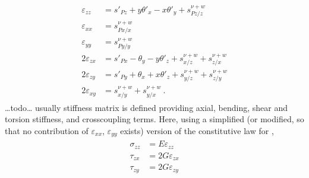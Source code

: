 \documentclass[letterpaper,10pt,english]{jupyterBook}
\begin{document}
\sphinxAtStartPar
{}
\begin{equation*}
\begin{split}\begin{aligned}
   \varepsilon_{zz} & = s'_{Pz} + y \theta'_x - x \theta'_y + s^{\nu+w}_{Pz/z} \\ 
   \varepsilon_{xx} & = s^{\nu+w}_{Px/x} \\
   \varepsilon_{yy} & = s^{\nu+w}_{Py/y} \\
 2 \varepsilon_{zx} & = s'_{Px} - \theta_y - y \theta'_z + s^{\nu+w}_{x/z} + s^{\nu+w}_{z/x} \\
 2 \varepsilon_{zy} & = s'_{Py} + \theta_x + x \theta'_z + s^{\nu+w}_{y/z} + s^{\nu+w}_{z/y} \\
 2 \varepsilon_{xy} & = s^{\nu+w}_{x/y} + s^{\nu+w}_{y/x} \ .
\end{aligned}\end{split}
\end{equation*}
\sphinxAtStartPar
{} …todo… usually stiffness matrix is defined providing axial, bending, shear and torsion stiffness, and cross\sphinxhyphen{}coupling terms. Here, using a simplified (or modified, so that no contribution of \(\varepsilon_{xx}\), \(\varepsilon_{yy}\) exists) version of the constitutive law for ,
\begin{equation*}
\begin{split}\begin{aligned}
  \sigma_{zz} & = E \varepsilon_{zz} \\
  \tau_{zx}   & = 2 G \varepsilon_{zx} \\
  \tau_{zy}   & = 2 G \varepsilon_{zy} \\
\end{aligned}\end{split}
\end{equation*}
\end{document}
